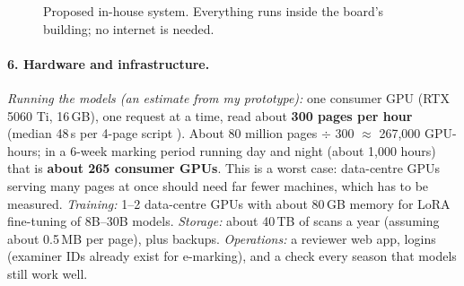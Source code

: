 \begin{figure}[H]
\centering
{}
\caption{Proposed in-house system. Everything runs inside the board's building; no internet is needed.}
\label{fig:q3arch}
\end{figure}

\paragraph{6. Hardware and infrastructure.} \emph{Running the models (an estimate from my prototype):} one consumer GPU
(RTX 5060 Ti, 16\,GB), one request at a time, read about \textbf{300 pages per hour} (median 48\,s per 4-page script
). About 80 million pages $\div$ 300 $\approx$ 267{,}000 GPU-hours; in a 6-week marking period running day and night
(about 1{,}000 hours) that is \textbf{about 265 consumer GPUs}. This is a worst case: data-centre GPUs serving many pages at
once should need far fewer machines, which has to be measured. \emph{Training:} 1--2 data-centre GPUs with about 80\,GB
memory for LoRA fine-tuning of 8B--30B models. \emph{Storage:} about 40\,TB of scans a year (assuming about 0.5\,MB per
page), plus backups. \emph{Operations:} a reviewer web app, logins (examiner IDs already exist for e-marking), and a
check every season that models still work well.

